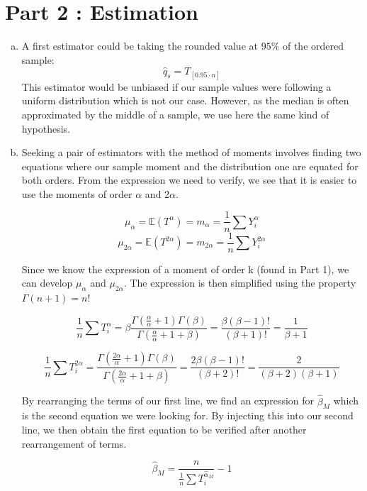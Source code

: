\documentclass[a4paper]{article}
\begin{document}

\newpage

\section{Part 2 : Estimation}

\begin{enumerate}[(a)]

\item A first estimator could be taking the rounded value at $ 95\% $ of the ordered sample:
$$\hat{q}_s = T_{[0.95\cdot n]}$$
This estimator would be unbiased if our sample values were following a uniform distribution which is not our case. However, as the median is often approximated by the middle of a sample, we use here the same kind of hypothesis.

\item Seeking a pair of estimators with the method of moments involves finding two equations where our sample moment and the distribution one are equated for both orders. From the expression we need to verify, we see that it is easier to use the moments of order $\alpha$ and $2\alpha$.

$$\mu_\alpha = \mathbb{E}(T^\alpha) = m_\alpha = \frac{1}{n}\sum Y_{i}^{\alpha}$$
$$\mu_{2\alpha} = \mathbb{E}(T^{2\alpha})= m_{2\alpha} = \frac{1}{n}\sum Y_{i}^{2\alpha}$$

Since we know the expression of a moment of order k (found in Part 1), we can develop $\mu_\alpha$ and $\mu_{2\alpha}$. The expression is then simplified using the property $\Gamma(n+1) = n!$

$$\frac{1}{n}\sum T_i^\alpha = \beta \frac{\Gamma(\frac{\alpha}{\alpha}+1)\Gamma(\beta)}{\Gamma(\frac{\alpha}{\alpha}+1+\beta)} = \frac{\beta(\beta-1)!}{(\beta+1)!} = \frac{1}{\beta+1}$$

$$\frac{1}{n}\sum T_i^{2\alpha} = \frac{\Gamma(\frac{2\alpha}{\alpha}+1)\Gamma(\beta)}{\Gamma(\frac{2\alpha}{\alpha}+1+\beta)} = \frac{2\beta(\beta-1)!}{(\beta+2)!} = \frac{2}{(\beta+2)(\beta+1)}$$

By rearranging the terms of our first line, we find an expression for $\hat{\beta}_M$ which is the second equation we were looking for. By injecting this into our second line, we then obtain the first equation to be verified after another rearrangement of terms.

$$\hat{\beta}_M = \frac{n}{\frac{1}{n}\sum T_i^{\hat{\alpha}_M}} - 1$$


\end{enumerate}
\end{document}
